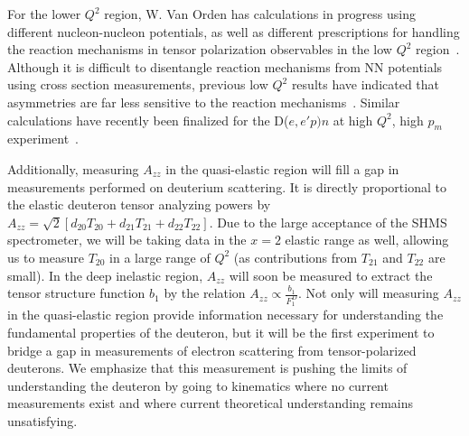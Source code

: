 For the lower $Q^2$ region, W. Van Orden has calculations in progress using different nucleon-nucleon potentials, as well as different prescriptions for handling the reaction mechanisms in tensor polarization observables in the low $Q^2$ region~\cite{vanorden-convo}. Although it is difficult to disentangle reaction mechanisms from NN potentials using cross section measurements, previous low $Q^2$ results have indicated that asymmetries are far less sensitive to the reaction mechanisms~\cite{Passchier:2001uc}. Similar calculations have recently been finalized for the D($e,e'p)n$ at high $Q^2$, high $p_m$ experiment~\cite{Ford:2014yua}. 

Additionally, measuring $A_{zz}$ in the quasi-elastic region will fill a gap in measurements performed on deuterium scattering. It is directly proportional to the elastic deuteron tensor analyzing powers by $A_{zz} = \sqrt{2} \left[ d_{20} T_{20} + d_{21} T_{21} + d_{22} T_{22}\right]$. Due to the large acceptance of the SHMS spectrometer, we will be taking data in the $x = 2$ elastic range as well, allowing us to measure $T_{20}$ in a large range of $Q^2$ (as contributions from $T_{21}$ and $T_{22}$ are small). In the deep inelastic region, $A_{zz}$ will soon be measured to extract the tensor structure function $b_1$ by the relation $A_{zz} \propto \frac{b_1}{F_1^D}$. Not only will measuring $A_{zz}$ in the quasi-elastic region provide information necessary for understanding the fundamental properties of the deuteron, but it will be the first experiment to bridge a gap in measurements of electron scattering from tensor-polarized deuterons. We emphasize that this measurement is pushing the limits of understanding the deuteron by going to kinematics where no current measurements exist and where current theoretical understanding remains unsatisfying.




